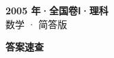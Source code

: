 \documentclass[zihao=-4, a4paper]{ctexart}
\begin{document}
\begin{center}
  {\Large\bfseries 2005 年·全国卷Ⅰ·理科}\\[4pt]
  {\large 数学 · 简答版}
\end{center}
\medskip
{}

\clearpage
{}
\begin{center}{\Large\bfseries 答案速查}\end{center}
\medskip

\end{document}

